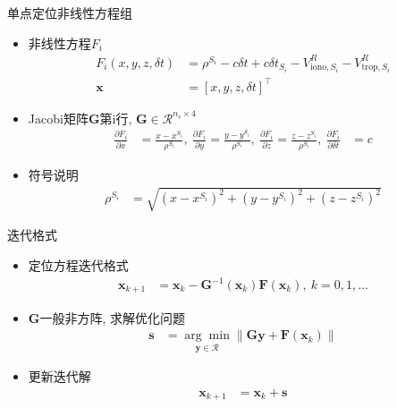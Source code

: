 \begin{frame}{单点定位非线性方程组}
    \begin{itemize}
        \item 非线性方程$F _ i$
        \begin{align*}
            F _ i \left( x, y, z, \delta t \right) &= \rho ^ { S _ i } - c \delta t
            + c \delta t _ { S _ i } - V _ { \mathrm{ iono }, S _ i } ^ R - V _ { \mathrm{ trop }, S _ i } ^ R \\
            \mathbf x &= \left[ x, y, z, \delta t \right] ^ \top
        \end{align*}
        \item Jacobi矩阵$\mathbf G$第i行, $\mathbf G \in \mathcal R ^ { n _ s \times 4 }$
        \begin{align*}
            \frac{ \partial F _ i }{ \partial x } &= \frac{ x - x ^ { S _ i } }{ \rho ^ { S _ i } }, \
            \frac{ \partial F _ i }{ \partial y } = \frac{ y - y ^ { S _ i } }{ \rho ^ { S _ i } }, \
            \frac{ \partial F _ i }{ \partial z } = \frac{ z - z ^ { S _ i } }{ \rho ^ { S _ i } }, \
            \frac{ \partial F _ i }{ \partial \delta t } &= c
        \end{align*}
        \item 符号说明
        \begin{align*}
            \rho ^ { S _ i } &= \sqrt{ \left( x - x ^ { S _ i } \right) ^ 2
            + \left( y - y ^ { S _ i } \right) ^ 2 + \left( z - z ^ { S _ i } \right) ^ 2 }
        \end{align*}
    \end{itemize}
\end{frame}

\begin{frame}{迭代格式}
    \begin{itemize}
        \item 定位方程迭代格式
        \begin{align*}
            \mathbf x _ { k + 1 } &= \mathbf x _ k - \mathbf G ^ { -1 } \left( \mathbf x _ k \right)
            \mathbf F \left( \mathbf x _ k \right), \ k = 0, 1, \ldots
        \end{align*}
        \item $\mathbf G$一般非方阵, 求解优化问题
        \begin{align*}
            \mathbf s &= \underset{ \mathbf y \in \mathcal R }{ \arg \min }
            \left\| \mathbf G \mathbf y  + \mathbf F \left( \mathbf x _ k \right) \right\|
        \end{align*}
        \item 更新迭代解
        \begin{align*}
            \mathbf x _ { k + 1 } &= \mathbf x _ k + \mathbf s
        \end{align*}
    \end{itemize}
\end{frame}

